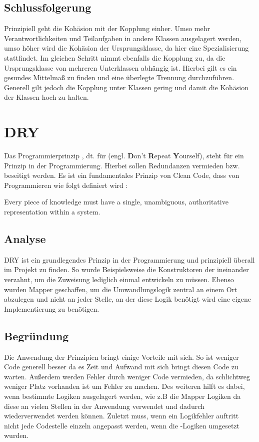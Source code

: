 		\subsection{Schlussfolgerung}
		Prinzipiell geht die Kohäsion mit der Kopplung einher. Umso mehr Verantwortlichkeiten und Teilaufgaben in andere Klassen ausgelagert werden, umso höher wird die Kohäsion der Ursprungsklasse, da hier eine Spezialisierung stattfindet. Im gleichen Schritt nimmt ebenfalls die Kopplung zu, da die Ursprungsklasse von mehreren Unterklassen abhängig ist. Hierbei gilt es ein gesundes Mittelmaß zu finden und eine überlegte Trennung durchzuführen. Generell gilt jedoch die Kopplung unter Klassen gering und damit die Kohäsion der Klassen hoch zu halten.
		
		
		
	\section{DRY}
	Das Programmierprinzip , dt. für  (engl. \textbf{D}on't \textbf{R}epeat \textbf{Y}ourself), steht für ein Prinzip in der Programmierung. Hierbei sollen Redundanzen vermieden bzw. beseitigt werden. Es ist ein fundamentales Prinzip von Clean Code, dass von Programmieren wie folgt definiert wird :
	\par Every piece of knowledge must have a single, unambiguous, authoritative representation within a system. \cite{dry.thevaluable}
	\\
		\subsection{Analyse}
		DRY ist ein grundlegendes Prinzip in der Programmierung und prinzipiell überall im Projekt zu finden. So wurde Beispielsweise die Konstruktoren der  ineinander verzahnt, um die Zuweisung lediglich einmal entwickeln zu müssen. Ebenso wurden Mapper geschaffen, um die Umwandlungslogik zentral an einem Ort abzulegen und nicht an jeder Stelle, an der diese Logik benötigt wird eine eigene Implementierung zu benötigen.
		
		\subsection{Begründung}
		Die Anwendung der  Prinzipien bringt einige Vorteile mit sich. So ist weniger Code generell besser da es Zeit und Aufwand mit sich bringt diesen Code zu warten. Außerdem werden Fehler durch weniger Code vermieden, da schlichtweg weniger Platz vorhanden ist um Fehler zu machen. Des weiteren hilft es dabei, wenn bestimmte Logiken ausgelagert werden, wie z.B die Mapper Logiken da diese an vielen Stellen in der Anwendung verwendet und dadurch wiederverwendet werden können. Zuletzt muss, wenn ein Logikfehler auftritt nicht jede Codestelle einzeln angepasst werden, wenn die -Logiken umgesetzt wurden.